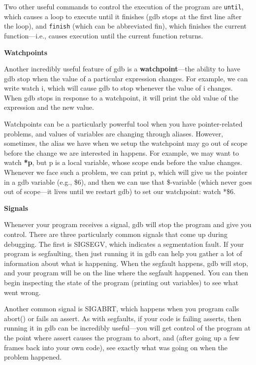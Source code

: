 \documentclass[11pt, a4paper]{article}
\begin{document}
Two other useful commands to control the execution of the program are \texttt{until}, which causes a loop to execute until it finishes (gdb stops at the first line after the loop), and \texttt{finish} (which can be abbreviated fin), which finishes the current function—i.e., causes execution until the current function returns.



\textbf{Watchpoints}

Another incredibly useful feature of gdb is a \textbf{watchpoint}—the ability to have gdb stop when the value of a particular expression changes. For example, we can write watch i, which will cause gdb to stop whenever the value of i changes. When gdb stops in response to a watchpoint, it will print the old value of the expression and the new value.

Watchpoints can be a particularly powerful tool when you have pointer-related problems, and values of variables are changing through aliases. However, sometimes, the alias we have when we setup the watchpoint may go out of scope before the change we are interested in happens. For example, we may want to watch \textbf{*p}, but p is a local variable, whose scope ends before the value changes. Whenever we face such a problem, we can print p, which will give us the pointer in a gdb variable (e.g., \$6), and then we can use that \$-variable (which never goes out of scope—it lives until we restart gdb) to set our watchpoint: watch *\$6.


\textbf{Signals}


Whenever your program receives a signal, gdb will stop the program and give you control. There are three particularly common signals that come up during debugging. The first is SIGSEGV, which indicates a segmentation fault. If your program is segfaulting, then just running it in gdb can help you gather a lot of information about what is happening. When the segfault happens, gdb will stop, and your program will be on the line where the segfault happened. You can then begin inspecting the state of the program (printing out variables) to see what went wrong.

Another common signal is SIGABRT, which happens when you program calls abort() or fails an assert. As with segfaults, if your code is failing asserts, then running it in gdb can be incredibly useful—you will get control of the program at the point where assert causes the program to abort, and (after going up a few frames back into your own code), see exactly what was going on when the problem happened.
\end{document}
